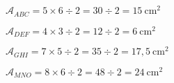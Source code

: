 \exo{}

$\mathcal{A}_{ABC}=5\times6\div2=30\div2=15~\text{cm}^2$

$\mathcal{A}_{DEF}=4\times3\div2=12\div2=6~\text{cm}^2$

$\mathcal{A}_{GHI}=7\times5\div2=35\div2=17,5~\text{cm}^2$

$\mathcal{A}_{MNO}=8\times6\div2=48\div2=24~\text{cm}^2$